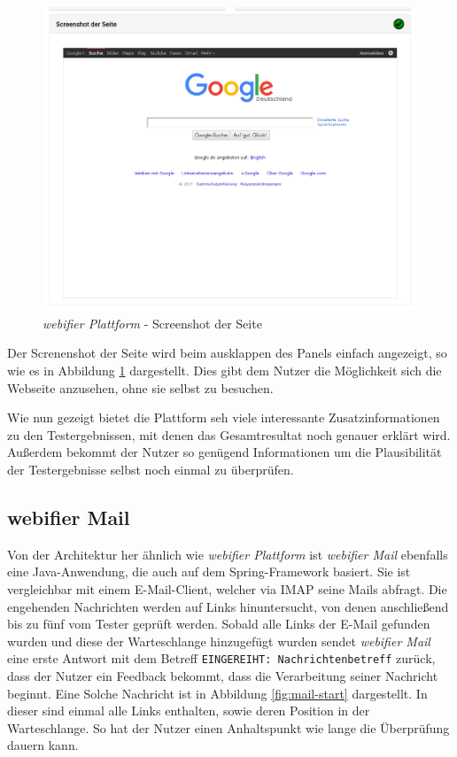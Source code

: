 \begin{figure}[H]
  \centering
  \includegraphics[width=\textwidth]{images/platform/screenshot-clean}
  \caption{\textit{webifier Plattform} - Screenshot der Seite}
  \label{fig:platform-result-screenshot}
\end{figure}

Der Screnenshot der Seite wird beim ausklappen des Panels einfach angezeigt, so wie es in Abbildung \ref{fig:platform-result-screenshot} dargestellt. Dies gibt dem Nutzer die Möglichkeit sich die Webseite anzusehen, ohne sie selbst zu besuchen.

Wie nun gezeigt bietet die Plattform seh viele interessante Zusatzinformationen zu den Testergebnissen, mit denen das Gesamtresultat noch genauer erklärt wird. Außerdem bekommt der Nutzer so genügend Informationen um die Plausibilität der Testergebnisse selbst noch einmal zu überprüfen.

\subsection{webifier Mail}

Von der Architektur her ähnlich wie \textit{webifier Plattform} ist \textit{webifier Mail} ebenfalls eine Java-Anwendung, die auch auf dem Spring-Framework basiert. Sie ist vergleichbar mit einem E-Mail-Client, welcher via IMAP seine Mails abfragt. Die engehenden Nachrichten werden auf Links hinuntersucht, von denen anschließend bis zu fünf vom Tester geprüft werden. Sobald alle Links der E-Mail gefunden wurden und diese der Warteschlange hinzugefügt wurden sendet \textit{webifier Mail} eine erste Antwort mit dem Betreff \lstinline[style=eclipse]{EINGEREIHT: Nachrichtenbetreff} zurück, dass der Nutzer ein Feedback bekommt, dass die Verarbeitung seiner Nachricht beginnt. Eine Solche Nachricht ist in Abbildung \ref{fig:mail-start} dargestellt. In dieser sind einmal alle Links enthalten, sowie deren Position in der Warteschlange. So hat der Nutzer einen Anhaltspunkt wie lange die Überprüfung dauern kann.

